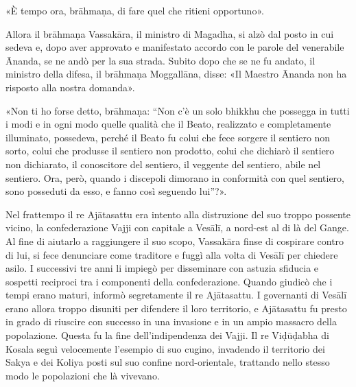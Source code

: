 «È tempo ora, brāhmaṇa, di fare quel che ritieni opportuno».

Allora il brāhmaṇa Vassakāra, il ministro di Magadha, si alzò dal posto in cui
sedeva e, dopo aver approvato e manifestato accordo con le parole del venerabile
Ānanda, se ne andò per la sua strada. Subito dopo che se ne fu andato, il
ministro della difesa, il brāhmaṇa Moggallāna, disse: «Il Maestro Ānanda non ha
risposto alla nostra domanda».

«Non ti ho forse detto, brāhmaṇa: “Non c’è un solo bhikkhu che possegga in tutti
i modi e in ogni modo quelle qualità che il Beato, realizzato e completamente
illuminato, possedeva, perché il Beato fu colui che fece sorgere il sentiero non
sorto, colui che produsse il sentiero non prodotto, colui che dichiarò il
sentiero non dichiarato, il conoscitore del sentiero, il veggente del sentiero,
abile nel sentiero. Ora, però, quando i discepoli dimorano in conformità con
quel sentiero, sono posseduti da esso, e fanno così seguendo lui”?».


 Nel frattempo il re Ajātasattu era intento alla
distruzione del suo troppo possente vicino, la confederazione Vajji con capitale
a Vesālī, a nord-est al di là del Gange. Al fine di aiutarlo a raggiungere il
suo scopo, Vassakāra finse di cospirare contro di lui, si fece denunciare come
traditore e fuggì alla volta di Vesālī per chiedere asilo. I successivi tre anni
li impiegò per disseminare con astuzia sfiducia e sospetti reciproci tra i
componenti della confederazione. Quando giudicò che i tempi erano maturi,
informò segretamente il re Ajātasattu. I governanti di Vesālī erano allora
troppo disuniti per difendere il loro territorio, e Ajātasattu fu presto in
grado di riuscire con successo in una invasione e in un ampio massacro della
popolazione. Questa fu la fine dell’indipendenza dei Vajji. Il re Viḍūḍabha di
Kosala seguì velocemente l’esempio di suo cugino, invadendo il territorio dei
Sakya e dei Koliya posti sul suo confine nord-orientale, trattando nello stesso
modo le popolazioni che là vivevano.

